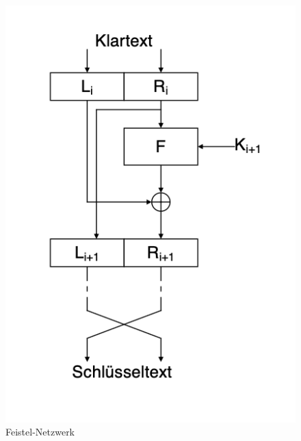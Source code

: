 \begin{figure}
  \centering
  \includegraphics{res/feistel.png}
  \caption{Feistel-Netzwerk}
  \label{fig:feistel}
\end{figure}